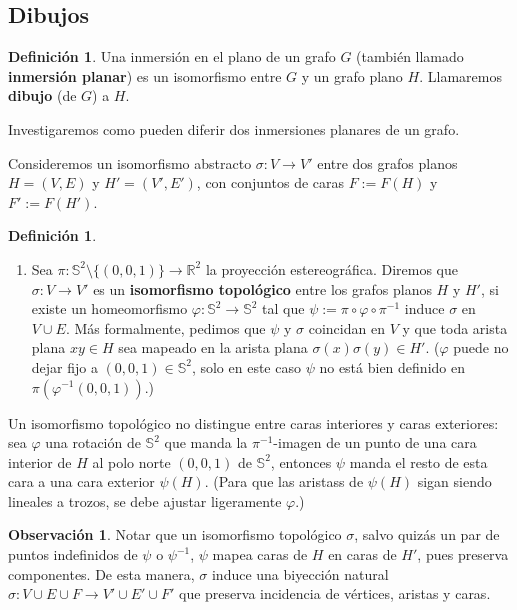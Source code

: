 \documentclass[12pt]{report}
\theoremstyle{plain}
\theoremstyle{definition}
\newtheorem{definition}[theorem]{Definición}
\newtheorem{obs}[theorem]{Observación}
\newcommand{\reals}{\mathbb{R}}
\begin{document}
\subsection{Dibujos}

\begin{definition}
Una inmersión en el plano de un grafo $G$ (también llamado \textbf{inmersión planar}) es un isomorfismo entre $G$ y un grafo plano $H$. Llamaremos \textbf{dibujo} (de $G$) a $H$.
\end{definition}

Investigaremos como pueden diferir dos inmersiones planares de un grafo.

Consideremos un isomorfismo abstracto $\sigma : V \rightarrow V'$ entre dos grafos planos $H = (V,E)$ y $H' = (V', E')$, con conjuntos de caras $F := F(H)$ y $F' := F(H')$.

\begin{definition}
\begin{enumerate}[(1)]
\item Sea $\pi : \mathbb{S}^2 \setminus \{(0,0,1)\} \rightarrow \reals^2$ la proyección estereográfica. Diremos que $\sigma : V \rightarrow V'$ es un \textbf{isomorfismo topológico} entre los grafos planos $H$ y $H'$, si existe un homeomorfismo $\varphi : \mathbb{S}^2 \rightarrow \mathbb{S}^2$ tal que $\psi := \pi \circ \varphi \circ \pi^{-1}$ induce $\sigma$ en $V \cup E$. Más formalmente, pedimos que $\psi$ y $\sigma$ coincidan en $V$ y que toda arista plana $xy \in H$ sea mapeado en la arista plana $\sigma (x) \sigma (y) \in H'$. ($\varphi$ puede no dejar fijo a $(0,0,1) \in \mathbb{S}^2$, solo en este caso $\psi$ no está bien definido en $\pi (\varphi^{-1} (0,0,1))$.)
\end{enumerate}
\end{definition}

Un isomorfismo topológico no distingue entre caras interiores y caras exteriores: sea $\varphi$ una rotación de $\mathbb{S}^2$ que manda la $\pi^{-1}$-imagen de un punto de una cara interior de $H$ al polo norte $(0,0,1)$ de $\mathbb{S}^2$, entonces $\psi$ manda el resto de esta cara a una cara exterior $\psi (H)$. (Para que las aristass de $\psi (H)$ sigan siendo lineales a trozos, se debe ajustar ligeramente $\varphi$.)

\begin{obs}
Notar que un isomorfismo topológico $\sigma$, salvo quizás un par de puntos indefinidos de $\psi$ o $\psi^{-1}$, $\psi$ mapea caras de $H$ en caras de $H'$, pues preserva componentes. De esta manera, $\sigma$ induce una biyección natural $\sigma : V \cup E \cup F \rightarrow V' \cup E' \cup F'$ que preserva incidencia de vértices, aristas y caras.
\end{obs}
\end{document}
